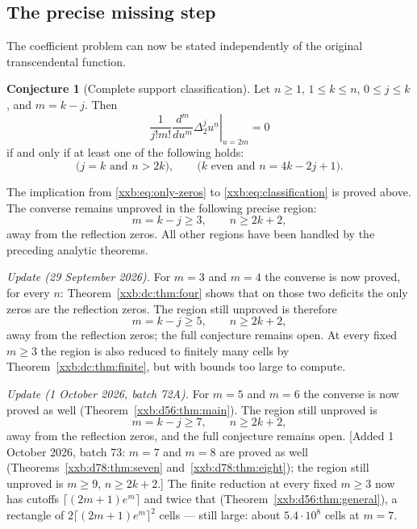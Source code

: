 \documentclass[11pt,a4paper]{article}
\numberwithin{equation}{section}
\theoremstyle{definition}
\newtheorem{conjecture}[theorem]{Conjecture}
\theoremstyle{remark}
\theoremstyle{plain}
\newcommand{\fall}[2]{#1^{\underline{#2}}}
\begin{document}
\subsection{The precise missing step}\label{xxb:sec:remaining}
The coefficient problem can now be stated independently of the original
transcendental function.
\begin{conjecture}[Complete support classification]\label{xxb:conj:support}
Let $n\ge1$, $1\le k\le n$, $0\le j\le k$, and $m=k-j$. Then
\begin{equation}\label{xxb:eq:classification}
 \frac{1}{j!m!}
 \left.\frac{d^m}{du^m}\Delta_2^j\fall{u}{n}\right|_{u=2m}=0
\end{equation}
if and only if at least one of the following holds:
\begin{equation}\label{xxb:eq:only-zeros}
 \bigl(j=k\text{ and }n>2k\bigr),
 \qquad
 \bigl(k\text{ even and }n=4k-2j+1\bigr).
\end{equation}
\end{conjecture}
The implication from \eqref{xxb:eq:only-zeros} to \eqref{xxb:eq:classification}
is proved above. The converse remains unproved in the following precise
region:
\begin{equation}\label{xxb:eq:gap-region}
 m=k-j\ge3,\qquad n\ge2k+2,
\end{equation}
away from the reflection zeros. All other regions have been handled by
the preceding analytic theorems.

\emph{Update (29 September 2026).}  For $m=3$ and $m=4$ the converse is now
proved, for every $n$: Theorem~\ref{xxb:dc:thm:four} shows that on those two
deficits the only zeros are the reflection zeros.  The region still unproved
is therefore
\[
 m=k-j\ge5,\qquad n\ge2k+2,
\]
away from the reflection zeros; the full conjecture remains open.  At every
fixed $m\ge3$ the region is also reduced to finitely many cells by
Theorem~\ref{xxb:dc:thm:finite}, but with bounds too large to compute.

\emph{Update (1 October 2026, batch 72A).}  For $m=5$ and $m=6$ the converse
is now proved as well (Theorem~\ref{xxb:d56:thm:main}).  The region still
unproved is
\[
 m=k-j\ge7,\qquad n\ge2k+2,
\]
away from the reflection zeros, and the full conjecture remains open.
[Added 1 October 2026, batch 73: $m=7$ and $m=8$ are proved as well
(Theorems~\ref{xxb:d78:thm:seven} and~\ref{xxb:d78:thm:eight}); the region still
unproved is $m\ge9$, $n\ge2k+2$.]  The
finite reduction at every fixed $m\ge3$ now has cutoffs
$\lceil(2m+1)e^m\rceil$ and twice that (Theorem~\ref{xxb:d56:thm:general}), a
rectangle of $2\lceil(2m+1)e^m\rceil^2$ cells --- still large: about
$5.4\cdot10^8$ cells at $m=7$.
\end{document}
